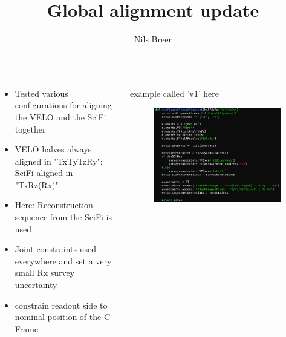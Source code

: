 \documentclass[aspectratio=1610, 12pt]{beamer}
\title{Global alignment update}
\author[N.Breer]{Nils Breer}
\institute{TU Dortmund, AG Albrecht}
\begin{document}
\maketitle

\begin{frame}
  \begin{columns}
    \begin{column}[c]{0.48\textwidth}
      \begin{itemize}
        \item Tested various configurations for aligning the VELO and the SciFi together
        \item VELO halves always aligned in "TxTyTzRy"; SciFi aligned in "TxRz(Rx)"
        \item Here: Reconstruction sequence from the SciFi is used
        \item Joint constraints used everywhere and set a very small Rx survey uncertainty
        \item constrain readout side to nominal position of the C-Frame
      \end{itemize}
    \end{column}
    \begin{column}[c]{0.48\textwidth}
      example called 'v1' here
      \begin{figure}
        \includegraphics[width=\textwidth]{plots/scenarios.png}
      \end{figure}
    \end{column}
  \end{columns}
\end{frame}
\end{document}
